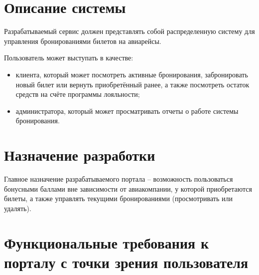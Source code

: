 \section{Описание системы}


Разрабатываемый сервис должен представлять собой распределенную систему для управления бронированиями билетов на авиарейсы.

Пользователь может выступать в качестве:
\begin{itemize}
    \item клиента, который может посмотреть активные бронирования, забронировать новый билет или вернуть приобретённый ранее, а также посмотреть остаток средств на счёте программы лояльности;
    \item администратора, который может просматривать отчеты о работе системы бронирования.
\end{itemize}


\section{Назначение разработки}


Главное назначение разрабатываемого портала -- возможность пользоваться бонусными баллами вне зависимости от авиакомпании, у которой приобретаются билеты, а также управлять текущими бронированиями (просмотривать или удалять).


\section{Функциональные требования к порталу с точки зрения пользователя}



